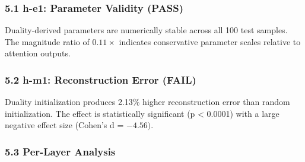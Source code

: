 
\subsubsection{5.1 h-e1: Parameter Validity (PASS)}

\begin{table}[htbp]
\centering
{}
\end{table}

Duality-derived parameters are numerically stable across all 100 test samples. The magnitude ratio of 0.$11\times$ indicates conservative parameter scales relative to attention outputs.

\subsubsection{5.2 h-m1: Reconstruction Error (FAIL)}

\begin{table}[htbp]
\centering
{}
\end{table}

Duality initialization produces 2.13\% higher reconstruction error than random initialization. The effect is statistically significant (p < 0.0001) with a large negative effect size (Cohen's d = $-4.56)$.

\subsubsection{5.3 Per-Layer Analysis}

